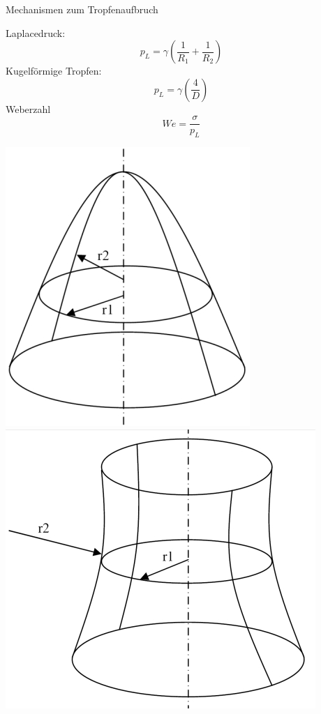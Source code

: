 \documentclass{beamer} %
\begin{document}
\begin{frame}{Mechanismen zum Tropfenaufbruch}
	\begin{minipage}{0.6\linewidth}
		Laplacedruck:
		\begin{equation*}
		p_L = \gamma \left(\frac{1}{R_1} + \frac{1}{R_2}\right)
		\end{equation*}
		Kugelförmige Tropfen:
		\begin{equation*}
		p_L = \gamma \left(\frac{4}{D}\right)
		\end{equation*}
		Weberzahl
		\begin{equation*}
		We = \frac{\sigma}{p_L}
		\end{equation*}
	\end{minipage}%
	\begin{minipage}{0.4\linewidth}
		\flushright
		\includegraphics[width=0.8\linewidth]{Markus/Synklastisch}\\
		\includegraphics[width=\linewidth]{Markus/Antiklastisch}
	\end{minipage}
\end{frame}
\end{document}
